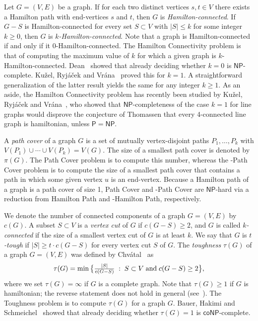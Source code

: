 \documentclass{llncs}
\renewcommand{\P}{{\mathsf P}}
\newcommand{\NP}{{\mathsf{NP}}}
\newcommand{\coNP}{{\mathsf{coNP}}}
\begin{document}
Let $G=(V,E)$ be a graph.
If for each two distinct vertices $s,t\in V$ there exists a Hamilton path with end-vertices $s$ and $t$, then
$G$ is {\em Hamilton-connected\/}. If $G-S$ is Hamilton-connected for every set $S\subset V$ with $|S|\le k$ for some integer $k\geq 0$, then
$G$ is {\em $k$-Hamilton-connected\/}. Note that a graph is Hamilton-connected if and only if it 0-Hamilton-connected. The  {\sc Hamilton Connectivity} problem is that of computing the
maximum value of $k$ for which a given graph is $k$-Hamilton-connected.  Dean~\cite{De93} showed that already deciding whether $k=0$ is $\NP$-complete.
Ku\v{z}el,  Ryj{\'a}\v{c}ek and Vr{\'a}na~\cite{KRV12} proved this for $k=1$. 
A straightforward generalization of the latter result yields the same for any integer $k\geq 1$.
As an aside, the {\sc Hamilton Connectivity} problem has recently been studied by Ku\v{z}el, Ryj\'a\v{c}ek and Vr\'ana~\cite{KRV12}, who showed that $\NP$-completeness of the case $k=1$
for line graphs would disprove the conjecture of Thomassen that every 4-connected line graph is hamiltonian, unless $\P=\NP$. 

A {\it path cover} of a graph $G$ is a set of mutually vertex-disjoint paths
 $P_1,\ldots,P_k$ with  $V(P_1)\cup \cdots \cup V(P_k)=V(G)$. The size of a smallest path cover is denoted by $\pi(G)$.
The {\sc Path Cover} problem is to compute this number, whereas the 
{-Path Cover} problem is to compute the size of a smallest path cover that contains a path in which some given vertex $u$ is an end-vertex.
Because a Hamilton path of a graph is a path cover of size 1, 
{\sc Path Cover} and {-Path Cover} are $\NP$-hard via a reduction from {\sc Hamilton Path} and {-Hamilton Path}, respectively.

We denote the number of connected components of a graph $G=(V,E)$ by $c(G)$. 
A subset $S\subset V$ is a
{\em vertex cut\/} of $G$ if $c(G-S)\geq 2$, and $G$ is called {\it $k$-connected} if the size of a smallest vertex cut of $G$ is at least $k$.
We say that $G$ is \mbox{{\em{$t$}-tough}} if $\vert S \vert \ge t \cdot 
c(G-S)$ for every vertex cut $S$ of  $G$. The {\em toughness\/} $\tau(G)$ of a graph $G=(V,E)$ was defined by Chv\'atal~\cite{Ch73} as
\[\tau(G)= \min\big{\{}\textstyle\frac{|S|}{c(G-S)}\; :\; S\subset V\; \mbox{and}\; c(G-S)\geq 2 \big{\}},\]
where we set $\tau (G)= \infty$ if $G$ is a complete graph.
Note that $\tau(G)\ge 1$ if $G$ is hamiltonian; the reverse statement does not hold in general (see~\cite{BM08}).
The {\sc Toughness} problem is to compute $\tau(G)$ for a graph $G$.
Bauer, Hakimi and Schmeichel~\cite{BHS90} showed that already deciding whether $\tau(G)=1$ is $\coNP$-complete.
\end{document}
